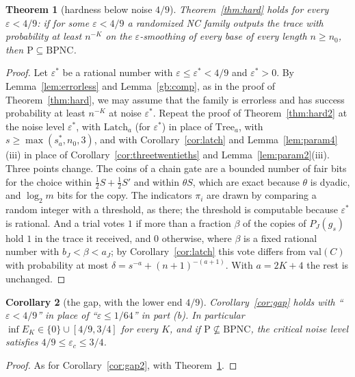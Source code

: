 \documentclass[11pt]{amsart}
\newtheorem{theorem}{Theorem}
\newtheorem{corollary}[theorem]{Corollary}
\theoremstyle{definition}
\theoremstyle{remark}
\newcommand{\eps}{\varepsilon}
\newcommand{\val}{\mathrm{val}}
\begin{document}
\begin{theorem}[hardness below noise $4/9$]\label{thm:hard4}
Theorem~\ref{thm:hard} holds for every $\eps<4/9$: if for some $\eps<4/9$ a randomized NC family
outputs the trace with probability at least $n^{-K}$ on the $\eps$-smoothing of every base of
every length $n\ge n_0$, then $\mathrm P\subseteq\mathrm{BPNC}$.
\end{theorem}

\begin{proof}
Let $\eps^*$ be a rational number with $\eps\le\eps^*<4/9$ and $\eps^*>0$. By Lemma~\ref{lem:errorless} and
Lemma~\ref{gb:comp}, as in the proof of Theorem~\ref{thm:hard}, we may assume that the family is
errorless and has success probability at least $n^{-K}$ at noise $\eps^*$. Repeat the proof of
Theorem~\ref{thm:hard2} at the noise level $\eps^*$, with $\mathrm{Latch}_a$ (for $\eps^*$) in
place of $\mathrm{Tree}_a$, with $s\ge\max(s^\ast_a,n_0,3)$, and with
Corollary~\ref{cor:latch} and Lemma~\ref{lem:param4}(iii) in place of
Corollary~\ref{cor:threetwentieths} and Lemma~\ref{lem:param2}(iii). Three points change. The
coins of a chain gate are a bounded number of fair bits for the choice within $\frac12S+\frac12S'$
and within $\theta S$, which are exact because $\theta$ is dyadic, and $\log_2m$ bits for the
copy. The indicators $\pi_i$ are drawn by comparing a random integer with a threshold, as there;
the threshold is computable because $\eps^*$ is rational. And a trial votes $1$ if more than a
fraction $\beta$ of the copies of $P_J(g_s)$ hold $1$ in the trace it received, and $0$ otherwise,
where $\beta$ is a fixed rational number with $b_J<\beta<a_J$; by Corollary~\ref{cor:latch} this
vote differs from $\val(C)$ with probability at most $\delta=s^{-a}+(n+1)^{-(a+1)}$. With $a=2K+4$ the rest is unchanged.
\end{proof}

\begin{corollary}[the gap, with the lower end $4/9$]\label{cor:gap4}
Corollary~\ref{cor:gap} holds with ``$\eps<4/9$'' in place of ``$\eps\le1/64$'' in part (b). In
particular $\inf E_K\in\{0\}\cup[4/9,3/4]$ for every $K$, and if
$\mathrm P\not\subseteq\mathrm{BPNC}$, the critical noise level satisfies
$4/9\le\eps_c\le3/4$.
\end{corollary}

\begin{proof}
As for Corollary~\ref{cor:gap2}, with Theorem~\ref{thm:hard4}.
\end{proof}
\end{document}
